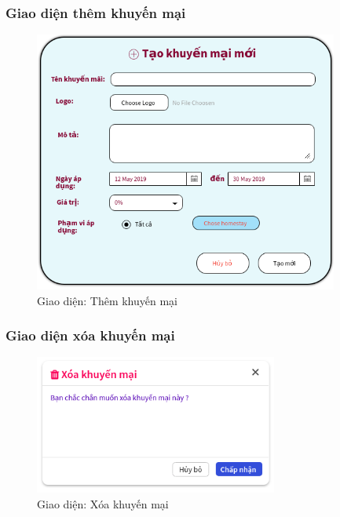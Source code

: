 \newpage 
\subsubsection{Giao diện thêm khuyến mại}
\begin{figure}[H]
	\centering
	\includegraphics[width=10cm]{Image/addPromo.png}
	\vspace{0.5cm}
	\caption{Giao diện: Thêm khuyến mại}
\end{figure}
\subsubsection{Giao diện xóa khuyến mại}
\begin{figure}[H]
	\centering
	\includegraphics[width=8cm]{Image/deletePromo.png}
	\vspace{0.5cm}
	\caption{Giao diện: Xóa khuyến mại}
\end{figure}